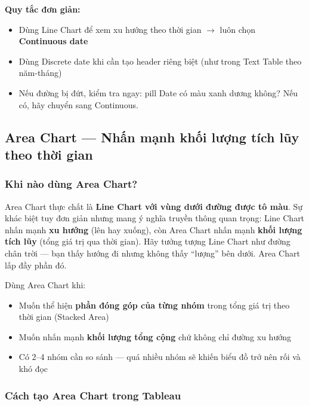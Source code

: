 \documentclass[12pt]{article}
\begin{document}
\begin{notebox}
\textbf{Quy tắc đơn giản:}
\begin{itemize}[nosep]
    \item Dùng Line Chart để xem xu hướng theo thời gian $\rightarrow$ luôn chọn \textbf{Continuous date}
    \item Dùng Discrete date khi cần tạo header riêng biệt (như trong Text Table theo năm-tháng)
    \item Nếu đường bị đứt, kiểm tra ngay: pill Date có màu xanh dương không? Nếu có, hãy chuyển sang Continuous.
\end{itemize}
\end{notebox}

\subsection{Area Chart --- Nhấn mạnh khối lượng tích lũy theo thời gian}

\subsubsection{Khi nào dùng Area Chart?}

\noindent Area Chart thực chất là \textbf{Line Chart với vùng dưới đường được tô màu}. Sự khác biệt tuy đơn giản nhưng mang ý nghĩa truyền thông quan trọng: Line Chart nhấn mạnh \textbf{xu hướng} (lên hay xuống), còn Area Chart nhấn mạnh \textbf{khối lượng tích lũy} (tổng giá trị qua thời gian). Hãy tưởng tượng Line Chart như đường chân trời --- bạn thấy hướng đi nhưng không thấy ``lượng'' bên dưới. Area Chart lấp đầy phần đó.

\noindent Dùng Area Chart khi:
\begin{itemize}[nosep]
    \item Muốn thể hiện \textbf{phần đóng góp của từng nhóm} trong tổng giá trị theo thời gian (Stacked Area)
    \item Muốn nhấn mạnh \textbf{khối lượng tổng cộng} chứ không chỉ đường xu hướng
    \item Có 2--4 nhóm cần so sánh --- quá nhiều nhóm sẽ khiến biểu đồ trở nên rối và khó đọc
\end{itemize}

\subsubsection{Cách tạo Area Chart trong Tableau}
\end{document}
